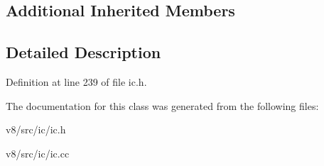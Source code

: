 \subsection*{Additional Inherited Members}


\subsection{Detailed Description}


Definition at line 239 of file ic.\+h.



The documentation for this class was generated from the following files\+:\begin{DoxyCompactItemize}
\item 
v8/src/ic/ic.\+h\item 
v8/src/ic/ic.\+cc\end{DoxyCompactItemize}
